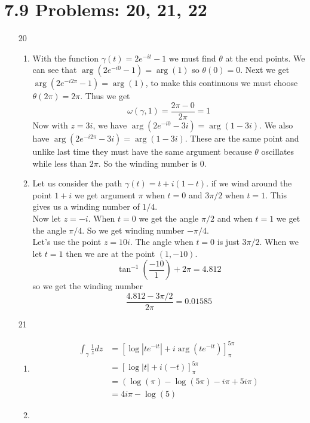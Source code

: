 \documentclass{article}
\begin{document}
  \section{7.9 Problems: 20, 21, 22}
  \begin{enumerate}
    \item[20]
      \begin{enumerate}[label=(\roman*)]
        \item
          With the function $\gamma(t)=2e^{-it}-1$ we must find $\theta$ at the end points. We can see that $\arg(2e^{-i0}-1)=\arg(1)$ so $\theta(0)=0$. Next we get $\arg(2e^{-i2\pi}-1)=\arg(1)$, to make this continuous we must choose $\theta(2\pi)=2\pi$. Thus we get
          \[\omega(\gamma,1)=\frac{2\pi-0}{2\pi}=1\]
          Now with $z=3i$, we have $\arg(2e^{-i0}-3i)=\arg(1-3i)$. We also have $\arg(2e^{-i2\pi}-3i)=\arg(1-3i)$. These are the same point and unlike last time they must have the same argument because $\theta$ oscillates while less than $2\pi$. So the winding number is 0.
        \item
          Let us consider the path $\gamma(t)=t+i(1-t)$. if we wind around the point $1+i$ we get argument $\pi$ when $t=0$ and $3\pi/2$ when $t=1$. This gives us a winding number of $1/4$.\\
          Now let $z=-i$. When $t=0$ we get the angle $\pi/2$ and when $t=1$ we get the angle $\pi/4$. So we get winding number $-\pi/4$.\\
          Let's use the point $z=10i$. The angle when $t=0$ is just $3\pi/2$. When we let $t=1$ then we are at the point $(1,-10)$.
          \[\tan^{-1}\left(\frac{-10}{1}\right)+2\pi=4.812\]
          so we get the winding number \[\frac{4.812-3\pi/2}{2\pi}=0.01585\]
      \end{enumerate}
    \item[21]
      \begin{enumerate}[label=(\roman*)]
        \item
          \begin{align*}
            \int_{\gamma}\frac{1}{z}dz&=[\log|te^{-it}|+i\arg(te^{-it})]_\pi^{5\pi}\\
            &=[\log|t|+i(-t)]_\pi^{5\pi}\\
            &=(\log(\pi)-\log(5\pi)-i\pi+5i\pi)\\
            &=4i\pi-\log(5)
          \end{align*}
        \item
          \begin{align*}

\end{align*}
\end{enumerate}
\end{enumerate}
\end{document}
